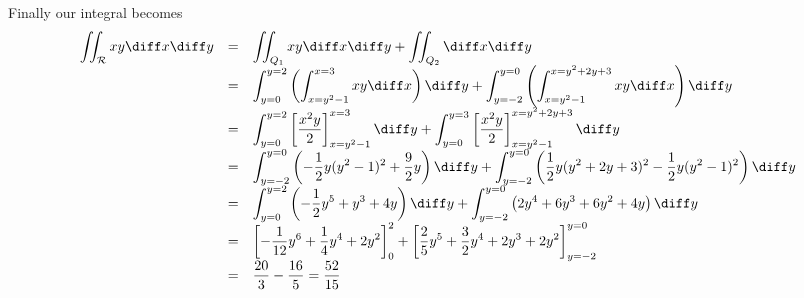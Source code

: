 {Finally our integral becomes 
\[
\begin{array}{rcl}
\displaystyle \iint_{\mathcal R} xy\diff x \diff y&=&\displaystyle \iint_{Q_1}xy \diff x \diff y + \iint_{Q_2}\diff x\diff y \\
&=&\displaystyle \int_{y=0}^{y=2} \left(\int_{x=y^2-1}^{x=3} xy \diff x\right) \diff y+ \int_{y=-2}^{y=0} \left( \int_{x=y^2-1}^{x=y^2+2y+3} xy \diff x \right) \diff y\\
&=&\displaystyle \int_{y=0}^{y=2}\left[ \frac{x^2y}{2}\right]_{x=y^2-1}^{x=3}\diff y+ \int_{y=0}^{y=3}\left[ \frac{x^2y}{2}\right]_{x=y^2-1}^{x=y^2+2y+3}\diff y\\
&=&\displaystyle \int_{y=-2}^{y=0}  \left(-\frac{1}{2} y (y^{2}-1)^{2}+\frac{9}{2} y \right)\diff y  +\int_{y=-2}^{y=0}\left( \frac{1}{2} y (y^{2}+2 y+3)^{2}-\frac{1}{2} y (y^{2}-1)^{2}\right)\diff y\\
&=&\displaystyle\int_{y=0}^{y=2}  \left(-\frac{1}{2} y^{5}+y^{3}+4 y  \right)\diff y  +\int_{y=-2}^{y=0}\left( 2 y^{4}+6 y^{3}+6 y^{2}+4 y\right)\diff y\\
&=&\displaystyle \left[-\frac{1}{12} y^{6}+\frac{1}{4} y^{4}+2 y^{2}\right]_{0}^{2} +\left[\frac{2}{5} y^{5}+\frac{3}{2} y^{4}+2 y^{3}+2 y^{2} \right]_{y=-2}^{y=0}\\
&=&\displaystyle \frac{20}{3} -\frac{16}{5} =\frac{52}{15}
\end{array}
\]

}